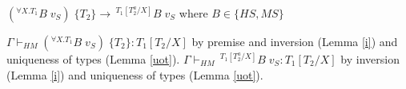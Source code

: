 \begin{case}
$(^{\forall X.T_{1}}B\;v_{S})\;\lbrace T_{2}\rbrace\rightarrow\,^{T_{1}[T_{2}^{a}/X]}B\;v_{S}$ where $B\in\lbrace HS,MS\rbrace$

$\Gamma\vdash_{HM}(^{\forall X.T_{1}}B\;v_{S})\;\lbrace T_{2}\rbrace:T_{1}[T_{2}/X]$ by premise and inversion (Lemma \ref{i}) and uniqueness of types (Lemma \ref{uot}).  $\Gamma\vdash_{HM}\,^{T_{1}[T_{2}^{a}/X]}B\;v_{S}:T_{1}[T_{2}/X]$ by inversion (Lemma \ref{i}) and uniqueness of types (Lemma \ref{uot}).
\end{case}